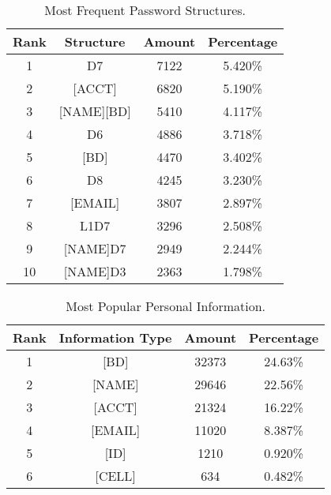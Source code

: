 \begin{table}
\centering
\caption{Most Frequent Password Structures.}
\begin{tabular}{|c|c|c|c|} \hline
Rank&Structure&Amount&Percentage\\ \hline
1&D7&7122&5.420\% \\
2&[ACCT]&6820&5.190\% \\
3&[NAME][BD]&5410&4.117\% \\
4&D6&4886&3.718\% \\
5&[BD]&4470&3.402\% \\
6&D8&4245&3.230\% \\
7&[EMAIL]&3807&2.897\% \\
8&L1D7&3296&2.508\% \\
9&[NAME]D7&2949&2.244\% \\
10&[NAME]D3&2363&1.798\% \\
\hline\end{tabular}
\label{t3}
\end{table}

\begin{table}
\centering
\caption{Most Popular Personal Information.}
\begin{tabular}{|c|c|c|c|} \hline
Rank&Information Type&Amount&Percentage\\ \hline
1&[BD]&32373&24.63\%\\
2&[NAME]&29646&22.56\%\\
3&[ACCT]&21324&16.22\%\\
4&[EMAIL]&11020&8.387\%\\
5&[ID]&1210&0.920\%\\
6&[CELL]&634&0.482\%\\
\hline\end{tabular}
\label{t4}
\end{table}

